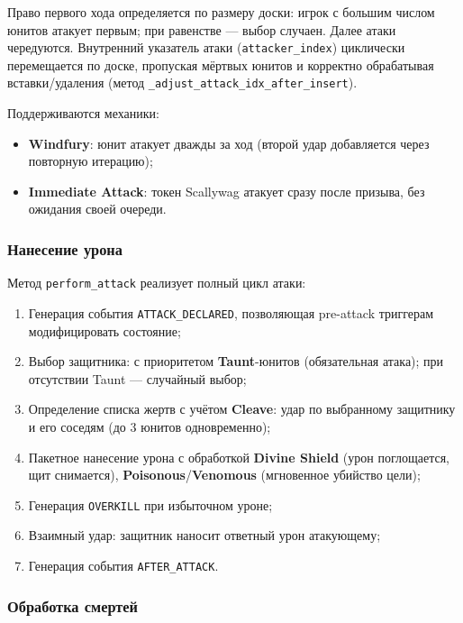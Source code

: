 \documentclass[a4paper,12pt]{extarticle}
\begin{document}
Право первого хода определяется по размеру доски: игрок с большим числом юнитов атакует первым; при равенстве --- выбор случаен. Далее атаки чередуются. Внутренний указатель атаки (\texttt{attacker\_index}) циклически перемещается по доске, пропуская мёртвых юнитов и корректно обрабатывая вставки/удаления (метод \texttt{\_adjust\_attack\_idx\_after\_insert}).

Поддерживаются механики:
\begin{itemize}[noitemsep]
  \item \textbf{Windfury}: юнит атакует дважды за ход (второй удар добавляется через повторную итерацию);
  \item \textbf{Immediate Attack}: токен Scallywag атакует сразу после призыва, без ожидания своей очереди.
\end{itemize}

\subsubsection{Нанесение урона}

Метод \texttt{perform\_attack} реализует полный цикл атаки:

\begin{enumerate}[noitemsep]
  \item Генерация события \texttt{ATTACK\_DECLARED}, позволяющая pre-attack триггерам модифицировать состояние;
  \item Выбор защитника: с приоритетом \textbf{Taunt}-юнитов (обязательная атака); при отсутствии Taunt --- случайный выбор;
  \item Определение списка жертв с учётом \textbf{Cleave}: удар по выбранному защитнику и его соседям (до 3 юнитов одновременно);
  \item Пакетное нанесение урона с обработкой \textbf{Divine Shield} (урон поглощается, щит снимается), \textbf{Poisonous}/\textbf{Venomous} (мгновенное убийство цели);
  \item Генерация \texttt{OVERKILL} при избыточном уроне;
  \item Взаимный удар: защитник наносит ответный урон атакующему;
  \item Генерация события \texttt{AFTER\_ATTACK}.
\end{enumerate}

\subsubsection{Обработка смертей}
\end{document}
